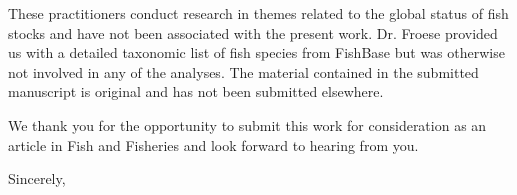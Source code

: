 \documentclass[letterpaper,12pt]{letter}
\begin{document}
\begin{letter}
These practitioners conduct research in themes related to the global
status of fish stocks and have not been associated with the present
work. Dr. Froese provided us with a detailed taxonomic list of fish
species from FishBase but was otherwise not involved in any of the
analyses. The material contained in the submitted manuscript is
original and has not been submitted elsewhere.

We thank you for the opportunity to submit this work for consideration
as an article in Fish and Fisheries and look forward to hearing from
you.


\closing{Sincerely,}

\end{letter}
\end{document}
